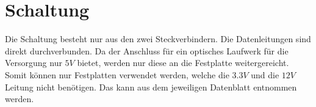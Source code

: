
\section{Schaltung}
Die Schaltung besteht nur aus den zwei Steckverbindern. Die Datenleitungen 
sind direkt durchverbunden. Da der Anschluss für ein optisches Laufwerk 
für die Versorgung nur $5 V$ bietet, werden nur diese an die Festplatte 
weitergereicht. Somit können nur Festplatten verwendet werden, welche die 
$3.3 V$ und die $12 V$ Leitung nicht benötigen. Das kann aus dem jeweiligen 
Datenblatt entnommen werden. 

